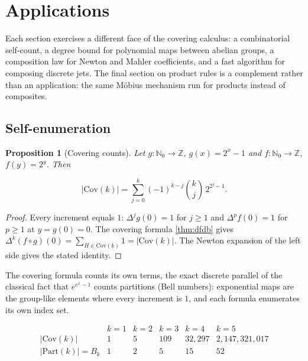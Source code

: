 \documentclass[10pt,a4paper]{article}
\theoremstyle{plain}
\newtheorem{proposition}[theorem]{Proposition}
\theoremstyle{definition}
\newcommand{\IN}{\mathbb{N}} %
\newcommand{\IZ}{\mathbb{Z}} %
\newcommand{\1}{\mathbb{1}} %
\newcommand{\Part}{\mathrm{Part}} %
\newcommand{\Cov}{\mathrm{Cov}} %
\begin{document}
\section{Applications}\label{applications}

Each section exercises a different face of the covering calculus: a
combinatorial self-count, a degree bound for polynomial maps between
abelian groups, a composition law for Newton and Mahler coefficients,
and a fast algorithm for composing discrete jets. The final section on
product rules is a complement rather than an application: the same
Möbius mechanism run for products instead of composites.

\subsection{Self-enumeration}\label{self-enumeration}

\begin{proposition}[Covering counts]

\label{prop:cover-count} Let \(g: \IN_0 \to \IZ\), \(g(x) = 2^x - 1\)
and \(f: \IN_0 \to \IZ\), \(f(y) = 2^y\). Then

\[
  |\Cov(k)| = \sum_{j=0}^{k} (-1)^{k-j} \binom{k}{j}\, 2^{2^j - 1}.
\]

\end{proposition}

\begin{proof}

Every increment equals \(1\): \(\Delta^j g(0) = 1\) for \(j \geq 1\) and
\(\Delta^p f(0) = 1\) for \(p \geq 1\) at \(y = g(0) = 0\). The covering
formula \ref{thm:dfdb} gives
\(\Delta^k(f \circ g)(0) = \sum_{H \in \Cov(k)} 1 = |\Cov(k)|\). The
Newton expansion of the left side gives the stated identity.

\end{proof}

The covering formula counts its own terms, the exact discrete parallel
of the classical fact that \(e^{e^x - 1}\) counts partitions (Bell
numbers): exponential maps are the group-like elements where every
increment is \(1\), and each formula enumerates its own index set.

\[
\begin{array}{l|rrrrr}
 & k=1 & k=2 & k=3 & k=4 & k=5 \\
\hline
|\Cov(k)| & 1 & 5 & 109 & 32{,}297 & 2{,}147{,}321{,}017 \\
|\Part(k)| = B_k & 1 & 2 & 5 & 15 & 52
\end{array}
\]
\end{document}
